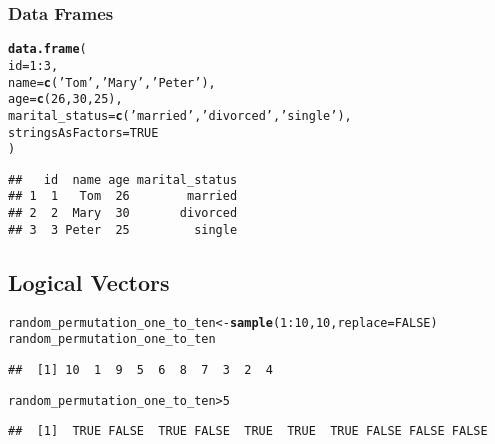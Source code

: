 \documentclass[../../dsa1101_notes.Rtex]{subfiles}\usepackage[]{graphicx}\usepackage[]{color}
\makeatletter
\newcommand{\hlnum}[1]{\textcolor[rgb]{0.686,0.059,0.569}{#1}}%
\newcommand{\hlstr}[1]{\textcolor[rgb]{0.192,0.494,0.8}{#1}}%
\newcommand{\hlopt}[1]{\textcolor[rgb]{0,0,0}{#1}}%
\newcommand{\hlstd}[1]{\textcolor[rgb]{0.345,0.345,0.345}{#1}}%
\newcommand{\hlkwb}[1]{\textcolor[rgb]{0.69,0.353,0.396}{#1}}%
\newcommand{\hlkwc}[1]{\textcolor[rgb]{0.333,0.667,0.333}{#1}}%
\newcommand{\hlkwd}[1]{\textcolor[rgb]{0.737,0.353,0.396}{\textbf{#1}}}%
\newenvironment{kframe}{%
 \def\at@end@of@kframe{}%
 \ifinner\ifhmode%
  \def\at@end@of@kframe{\end{minipage}}%
  \begin{minipage}{\columnwidth}%
 \fi\fi%
 \def\FrameCommand##1{\hskip\@totalleftmargin \hskip-\fboxsep
 \colorbox{shadecolor}{##1}\hskip-\fboxsep
     \hskip-\linewidth \hskip-\@totalleftmargin \hskip\columnwidth}%
 \MakeFramed {\advance\hsize-\width
   \@totalleftmargin\z@ \linewidth\hsize
   \@setminipage}}%
 {\par\unskip\endMakeFramed%
 \at@end@of@kframe}
\newenvironment{knitrout}{}{} %
\makeatother
\begin{document}
  \subsubsection{Data Frames}
\begin{knitrout}
\color{fgcolor}\begin{kframe}
\begin{alltt}
  \hlkwd{data.frame}\hlstd{(}
    \hlkwc{id} \hlstd{=} \hlnum{1}\hlopt{:}\hlnum{3}\hlstd{,}
    \hlkwc{name} \hlstd{=} \hlkwd{c}\hlstd{(}\hlstr{'Tom'}\hlstd{,} \hlstr{'Mary'}\hlstd{,} \hlstr{'Peter'}\hlstd{),}
    \hlkwc{age} \hlstd{=} \hlkwd{c}\hlstd{(}\hlnum{26}\hlstd{,}\hlnum{30}\hlstd{,}\hlnum{25}\hlstd{),}
    \hlkwc{marital_status} \hlstd{=} \hlkwd{c}\hlstd{(}\hlstr{'married'}\hlstd{,}\hlstr{'divorced'}\hlstd{,}\hlstr{'single'}\hlstd{),}
    \hlkwc{stringsAsFactors} \hlstd{=} \hlnum{TRUE}
  \hlstd{)}
\end{alltt}
\begin{verbatim}
##   id  name age marital_status
## 1  1   Tom  26        married
## 2  2  Mary  30       divorced
## 3  3 Peter  25         single
\end{verbatim}
\end{kframe}
\end{knitrout}
  
  \subsection{Logical Vectors}
\begin{knitrout}
\color{fgcolor}\begin{kframe}
\begin{alltt}
  \hlstd{random_permutation_one_to_ten} \hlkwb{<-} \hlkwd{sample}\hlstd{(}\hlnum{1}\hlopt{:}\hlnum{10}\hlstd{,} \hlnum{10}\hlstd{,} \hlkwc{replace}\hlstd{=}\hlnum{FALSE}\hlstd{)}
\hlstd{random_permutation_one_to_ten}
\end{alltt}
\begin{verbatim}
##  [1] 10  1  9  5  6  8  7  3  2  4
\end{verbatim}
\begin{alltt}
\hlstd{random_permutation_one_to_ten} \hlopt{>} \hlnum{5}
\end{alltt}
\begin{verbatim}
##  [1]  TRUE FALSE  TRUE FALSE  TRUE  TRUE  TRUE FALSE FALSE FALSE
\end{verbatim}
\end{kframe}
\end{knitrout}
  
\end{document}
